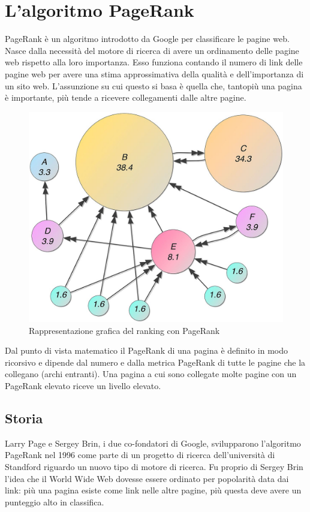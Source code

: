 \documentclass[a4paper, 12pt]{article}
\let\oldsection\section
\renewcommand\section{\clearpage\oldsection}
\begin{document}
\section{L'algoritmo PageRank}
PageRank è un algoritmo introdotto da Google per classificare le pagine web. 
Nasce dalla necessità del motore di ricerca di avere un ordinamento delle pagine web rispetto alla loro importanza. Esso funziona contando il numero di link delle pagine web per avere una stima approssimativa della qualità e dell'importanza di un sito web. L'assunzione su cui questo si basa è quella che, tantopiù una pagina è importante, più tende a ricevere collegamenti dalle altre pagine.
\begin{figure}[h!]
  \includegraphics[width=\linewidth]{images/pagerank.jpg}
  \caption{Rappresentazione grafica del ranking con PageRank}
\end{figure}
Dal punto di vista matematico il PageRank di una pagina è definito in modo ricorsivo e dipende dal numero e dalla metrica PageRank di tutte le pagine che la collegano (archi entranti). Una pagina a cui sono collegate molte pagine con un PageRank elevato riceve un livello elevato.
\subsection{Storia}
Larry Page e Sergey Brin, i due co-fondatori di Google, svilupparono l'algoritmo PageRank nel 1996 come parte di un progetto di ricerca dell'università di Standford riguardo un nuovo tipo di motore di ricerca. Fu proprio di Sergey Brin l'idea che il World Wide Web dovesse essere ordinato per popolarità data dai link: più una pagina esiste come link nelle altre pagine, più questa deve avere un punteggio alto in classifica.
\end{document}

